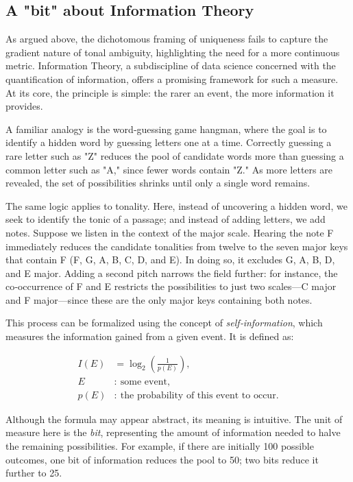 \documentclass[10pt,twocolumn]{article}
\numberwithin{equation}{section} %
\begin{document}
    \subsection{A "bit" about Information Theory}

    As argued above, the dichotomous framing of uniqueness fails to capture the gradient nature of tonal ambiguity, highlighting the need for a more continuous metric.
    Information Theory, a subdiscipline of data science concerned with the quantification of information\citep{shannon1948}, offers a promising framework for such a measure.
    At its core, the principle is simple: the rarer an event, the more information it provides.

    A familiar analogy is the word‑guessing game hangman, where the goal is to identify a hidden word by guessing letters one at a time.
    Correctly guessing a rare letter such as "Z" reduces the pool of candidate words more than guessing a common letter such as "A," since fewer words contain "Z."
    As more letters are revealed, the set of possibilities shrinks until only a single word remains.

    The same logic applies to tonality.
    Here, instead of uncovering a hidden word, we seek to identify the tonic of a passage; and instead of adding letters, we add notes.
    Suppose we listen in the context of the major scale.
    Hearing the note F immediately reduces the candidate tonalities from twelve to the seven major keys that contain F (F, G\text{$\flat$}, A\text{$\flat$}, B\text{$\flat$}, C, D\text{$\flat$}, and E\text{$\flat$}).
    In doing so, it excludes G, A, B, D, and E major.
    Adding a second pitch narrows the field further: for instance, the co‑occurrence of F and E restricts the possibilities to just two scales—C major and F major—since these are the only major keys containing both notes.

    This process can be formalized using the concept of \textit{self}\textit{‑}\textit{information}, which measures the information gained from a given event.
    It is defined as:

    \begin{align}
        I(E) &= \log_{2} \left( \frac{1}{p(E)} \right), \\
        E &:\ \text{some event}, \\
        p(E) &:\ \text{the probability of this event to occur}.
    \end{align}


    Although the formula may appear abstract, its meaning is intuitive.
    The unit of measure here is the \textit{bit}, representing the amount of information needed to halve the remaining possibilities.
    For example, if there are initially 100 possible outcomes, one bit of information reduces the pool to 50; two bits reduce it further to 25.
\end{document}
